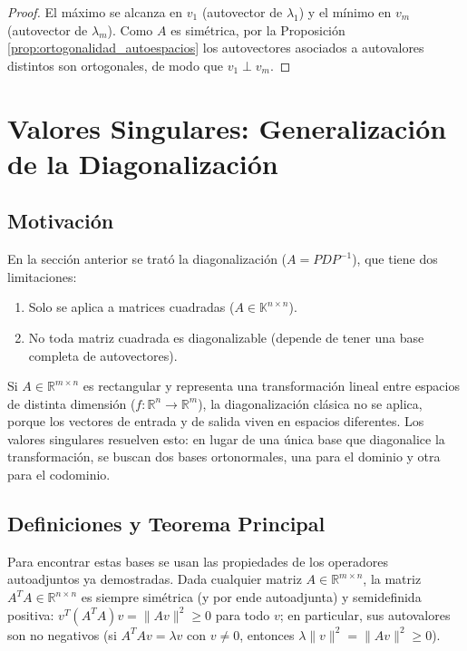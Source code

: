 \documentclass[11pt, a4paper]{article}
\begin{document}
\begin{proof}
El máximo se alcanza en $v_1$ (autovector de $\lambda_1$) y el mínimo en $v_m$ (autovector de $\lambda_m$). Como $A$ es simétrica, por la Proposición \ref{prop:ortogonalidad_autoespacios} los autovectores asociados a autovalores distintos son ortogonales, de modo que $v_1 \perp v_m$.
\end{proof}

\newpage

\section{Valores Singulares: Generalización de la Diagonalización}

\subsection{Motivación}

En la sección anterior se trató la diagonalización ($A = P D P^{-1}$), que tiene dos limitaciones:
\begin{enumerate}
    \item Solo se aplica a matrices cuadradas ($A \in \mathbb{K}^{n \times n}$).
    \item No toda matriz cuadrada es diagonalizable (depende de tener una base completa de autovectores).
\end{enumerate}

Si $A \in \mathbb{R}^{m \times n}$ es rectangular y representa una transformación lineal entre espacios de distinta dimensión ($f: \mathbb{R}^n \to \mathbb{R}^m$), la diagonalización clásica no se aplica, porque los vectores de entrada y de salida viven en espacios diferentes. Los valores singulares resuelven esto: en lugar de una única base que diagonalice la transformación, se buscan dos bases ortonormales, una para el dominio y otra para el codominio.

\subsection{Definiciones y Teorema Principal}

Para encontrar estas bases se usan las propiedades de los operadores autoadjuntos ya demostradas. Dada cualquier matriz $A \in \mathbb{R}^{m \times n}$, la matriz $A^T A \in \mathbb{R}^{n \times n}$ es siempre simétrica (y por ende autoadjunta) y semidefinida positiva: $v^T (A^T A) v = \|Av\|^2 \ge 0$ para todo $v$; en particular, sus autovalores son no negativos (si $A^T A v = \lambda v$ con $v \neq 0$, entonces $\lambda \|v\|^2 = \|Av\|^2 \ge 0$).
\end{document}
